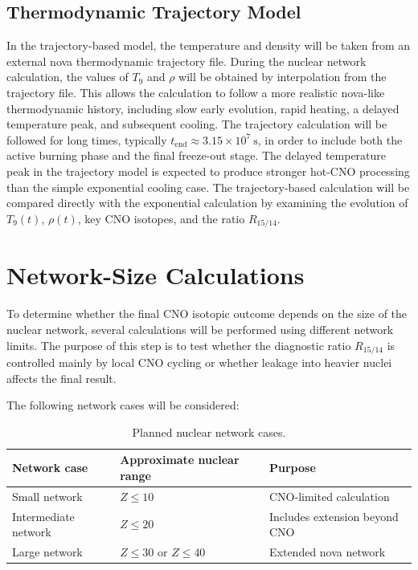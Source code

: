 \subsection{Thermodynamic Trajectory Model}

In the trajectory-based model, the temperature and density will be taken from an external nova thermodynamic trajectory file. During the nuclear network calculation, the values of $T_9$ and $\rho$ will be obtained by interpolation from the trajectory file. This allows the calculation to follow a more realistic nova-like thermodynamic history, including slow early evolution, rapid heating, a delayed temperature peak, and subsequent cooling. The trajectory calculation will be followed for long times, typically $t_{\mathrm{end}} \approx 3.15\times10^7~\mathrm{s}$, in order to include both the active burning phase and the final freeze-out stage. The delayed temperature peak in the trajectory model is expected to produce stronger hot-CNO processing than the simple exponential cooling case. The trajectory-based calculation will be compared directly with the exponential calculation by examining the evolution of $T_9(t)$, $\rho(t)$, key CNO isotopes, and the ratio $R_{15/14}$.

\section{Network-Size Calculations}

To determine whether the final CNO isotopic outcome depends on the size of the nuclear network, several calculations will be performed using different network limits. The purpose of this step is to test whether the diagnostic ratio $R_{15/14}$ is controlled mainly by local CNO cycling or whether leakage into heavier nuclei affects the final result.

The following network cases will be considered:

\begin{table}[h!]
\centering
\caption{Planned nuclear network cases.}
\begin{tabular}{lll}
\hline
Network case & Approximate nuclear range & Purpose \\
\hline
Small network & $Z \leq 10$ & CNO-limited calculation \\
Intermediate network & $Z \leq 20$ & Includes extension beyond CNO \\
Large network & $Z \leq 30$ or $Z \leq 40$ & Extended nova network \\
\hline
\end{tabular}
\label{tab:network_cases}
\end{table}

